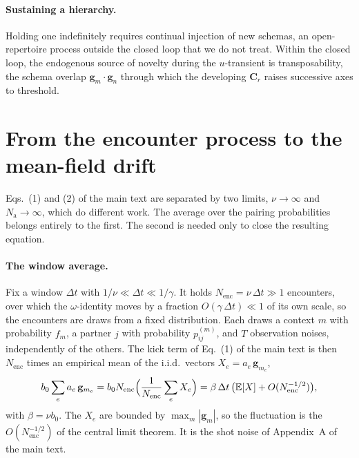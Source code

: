 \documentclass[
  aps,prx,
  preprint,
  superscriptaddress,
  nofootinbib
]{revtex4-2}
\newcommand{\g}{\mathbf{g}}
\newcommand{\Cr}{\mathbf{C}_r}
\newcommand{\Nag}{N_{\mathrm{a}}}
\begin{document}
\paragraph{Sustaining a hierarchy.} Holding one indefinitely requires continual injection of new schemas, an open-repertoire process outside the closed loop that we do not treat. Within the closed loop, the endogenous source of novelty during the $u$-transient is transposability, the schema overlap $\g_m\cdot\g_n$ through which the developing $\Cr$ raises successive axes to threshold.

\bigskip
\section{From the encounter process to the mean-field drift}\label{sm:reduction}

\noindent Eqs.~(1) and (2) of the main text are separated by two limits, $\nu\to\infty$ and $\Nag\to\infty$, which do different work. The average over the pairing probabilities belongs entirely to the first. The second is needed only to close the resulting equation.

\paragraph{The window average.} Fix a window $\Delta t$ with $1/\nu\ll\Delta t\ll1/\gamma$. It holds $N_{\mathrm{enc}}=\nu\,\Delta t\gg1$ encounters, over which the $\omega$-identity moves by a fraction $O(\gamma\,\Delta t)\ll1$ of its own scale, so the encounters are draws from a fixed distribution. Each draws a context $m$ with probability $f_m$, a partner $j$ with probability $p^{(m)}_{ij}$, and $T$ observation noises, independently of the others. The kick term of Eq.~(1) of the main text is then $N_{\mathrm{enc}}$ times an empirical mean of the i.i.d.\ vectors $X_e=a_e\,\g_{m_e}$,
\begin{equation}\label{SM-eq:sm-window}
b_0\sum_{e}a_e\,\g_{m_e}=b_0N_{\mathrm{enc}}\Bigl(\frac1{N_{\mathrm{enc}}}\sum_e X_e\Bigr)=\beta\,\Delta t\,\bigl(\mathbb E[X]+O(N_{\mathrm{enc}}^{-1/2})\bigr),
\end{equation}
with $\beta=\nu b_0$. The $X_e$ are bounded by $\max_m|\g_m|$, so the fluctuation is the $O(N_{\mathrm{enc}}^{-1/2})$ of the central limit theorem. It is the shot noise of Appendix~A of the main text.
\end{document}
